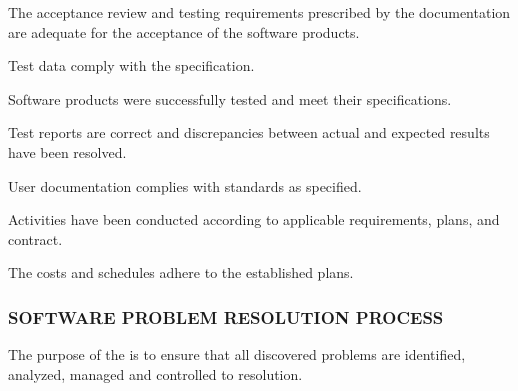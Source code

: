 \begin{adjustwidth}{2em}{0pt}
\begin{compactenum}
\begin{compactenum}
\begin{compactenum}
							\item The acceptance review and testing requirements prescribed by the documentation are adequate for the acceptance of the software products.

							\item Test data comply with the specification.

							\item Software products were successfully tested and meet their specifications.

							\item Test reports are correct and discrepancies between actual and expected results have been resolved.

							\item User documentation complies with standards as specified.

							\item Activities have been conducted according to applicable requirements, plans, and contract.

							\item The costs and schedules adhere to the established plans.

						\end{compactenum}

					\end{compactenum}

				\end{compactenum}

			\end{adjustwidth}

		\newpage
		\subsubsection{SOFTWARE PROBLEM RESOLUTION PROCESS\label{proc:software_problem_resolution_process}}

			\begin{adjustwidth}{2em}{0pt} 

				The purpose of the  is to ensure that all discovered problems are identified, analyzed, managed and controlled to resolution.

			\end{adjustwidth}

